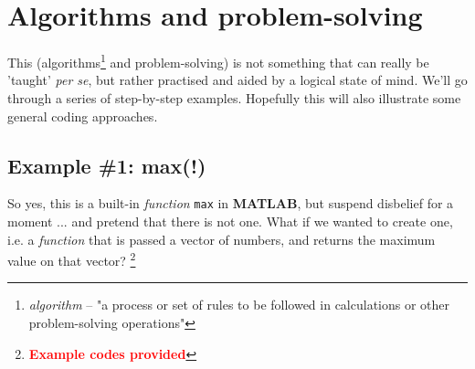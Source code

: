 \documentclass{tufte-book} %
\begin{document}

\newpage


\section{Algorithms and problem-solving}

This (algorithms\footnote{\textit{algorithm} -- "a process or set of rules to be followed in calculations or other problem-solving operations"}  and problem-solving) is not something that can really be 'taught' \textit{per se}, but rather practised and aided by a logical state of mind. We'll go through a series of step-by-step examples. Hopefully this will also illustrate some general coding approaches.


\subsection{Example \#1: max(!)}

So yes, this is a built-in \textit{function} \texttt{max} in \textbf{MATLAB}, but suspend disbelief for a moment ... and pretend that there is not one. What if we wanted to create one, i.e. a \textit{function} that is passed a vector of numbers, and returns the maximum value on that vector? \footnote{\textcolor{red}{\textbf{Example codes provided}}}
\end{document}
